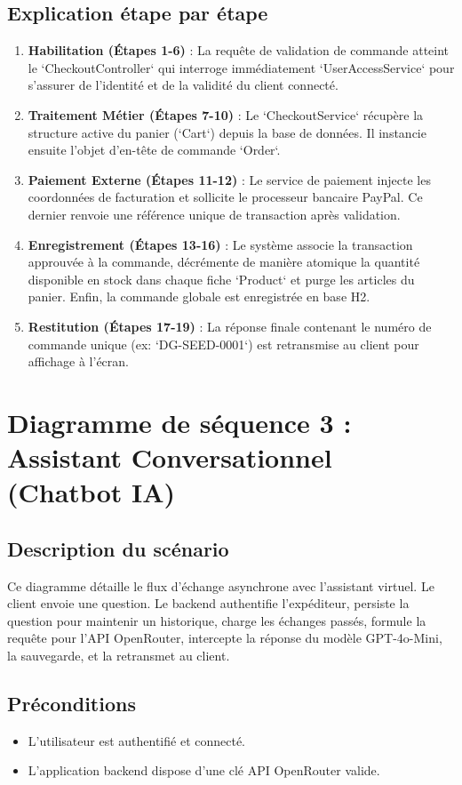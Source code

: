 \documentclass[12pt,a4paper,oneside]{report}
\begin{document}
\subsection{Explication étape par étape}
\begin{enumerate}
    \item \textbf{Habilitation (Étapes 1-6)} : La requête de validation de commande atteint le `CheckoutController` qui interroge immédiatement `UserAccessService` pour s'assurer de l'identité et de la validité du client connecté.
    \item \textbf{Traitement Métier (Étapes 7-10)} : Le `CheckoutService` récupère la structure active du panier (`Cart`) depuis la base de données. Il instancie ensuite l'objet d'en-tête de commande `Order`.
    \item \textbf{Paiement Externe (Étapes 11-12)} : Le service de paiement injecte les coordonnées de facturation et sollicite le processeur bancaire PayPal. Ce dernier renvoie une référence unique de transaction après validation.
    \item \textbf{Enregistrement (Étapes 13-16)} : Le système associe la transaction approuvée à la commande, décrémente de manière atomique la quantité disponible en stock dans chaque fiche `Product` et purge les articles du panier. Enfin, la commande globale est enregistrée en base H2.
    \item \textbf{Restitution (Étapes 17-19)} : La réponse finale contenant le numéro de commande unique (ex: `DG-SEED-0001`) est retransmise au client pour affichage à l'écran.
\end{enumerate}

\section{Diagramme de séquence 3 : Assistant Conversationnel (Chatbot IA)}

\subsection{Description du scénario}
Ce diagramme détaille le flux d'échange asynchrone avec l'assistant virtuel. Le client envoie une question. Le backend authentifie l'expéditeur, persiste la question pour maintenir un historique, charge les échanges passés, formule la requête pour l'API OpenRouter, intercepte la réponse du modèle GPT-4o-Mini, la sauvegarde, et la retransmet au client.

\subsection{Préconditions}
\begin{itemize}
    \item L'utilisateur est authentifié et connecté.
    \item L'application backend dispose d'une clé API OpenRouter valide.
\end{itemize}
\end{document}
